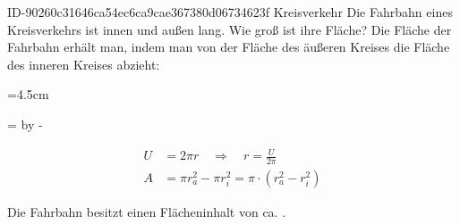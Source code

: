 \begin{exercise}
      {ID-90260c31646ca54ec6ca9cae367380d06734623f}
      {Kreisverkehr}
  \ifproblem\problem
    Die Fahrbahn eines Kreisverkehrs ist innen  und außen
     lang. Wie groß ist ihre Fläche?
  \fi
  \ifoutline\outline
    Die Fläche der Fahrbahn erhält man, indem man von der Fläche des
    äußeren Kreises die Fläche des inneren Kreises abzieht:\par
    \begingroup
      =4.5cm%
      \begin{minipage}{\dimen1}%
      \end{minipage}%
      =\linewidth%
      \advance{} by -%
      \begin{minipage}{\dimen2}%
        \setlength{\abovedisplayskip}{0pt}%
        \begin{equation*}
          \begin{split}
            U&=2\pi r
            \quad\Rightarrow\quad
            r=\frac{U}{2\pi}
            \\[2ex]
            A&=\pi r_a^2-\pi r_i^2
              =\pi\cdot\left(r_a^2-r_i^2\right)
          \end{split}
        \end{equation*}
      \end{minipage}%
    \endgroup
  \fi
  \ifoutcome\outcome
    Die Fahrbahn besitzt einen Flächeninhalt von ca. .
  \fi
\end{exercise}

